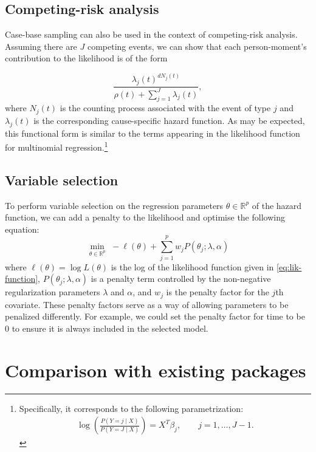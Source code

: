 \hypertarget{competing-risk-analysis}{%
\subsection{Competing-risk analysis}\label{competing-risk-analysis}}

Case-base sampling can also be used in the context of competing-risk
analysis. Assuming there are \(J\) competing events, we can show that
each person-moment's contribution to the likelihood is of the form

\[\frac{\lambda_j(t)^{dN_j(t)}}{\rho(t) + \sum_{j=1}^J\lambda_j(t)},\]
where \(N_j(t)\) is the counting process associated with the event of
type \(j\) and \(\lambda_j(t)\) is the corresponding cause-specific
hazard function. As may be expected, this functional form is similar to
the terms appearing in the likelihood function for multinomial
regression.\footnote{Specifically, it corresponds to the following parametrization: \begin{align*} \log\left(\frac{P(Y=j \mid X)}{P(Y = J \mid X)}\right) = X^T\beta_j, \qquad j = 1,\ldots, J-1.\end{align*}}

\hypertarget{variable-selection}{%
\subsection{Variable selection}\label{variable-selection}}

To perform variable selection on the regression parameters
\(\theta \in \mathbb{R}^p\) of the hazard function, we can add a penalty
to the likelihood and optimise the following equation: \begin{equation}
\min _{\theta \in \mathbb{R}^{p}}\,\,-\ell\left(\theta\right)+\sum_{j=1}^p w_j P(\theta_j;\lambda,\alpha) \label{eq:penest}
\end{equation} where \(\ell\left(\theta\right) = \log L(\theta)\) is the
log of the likelihood function given in \eqref{eq:lik-function},
\(P(\theta_j;\lambda,\alpha)\) is a penalty term controlled by the
non-negative regularization parameters \(\lambda\) and \(\alpha\), and
\(w_j\) is the penalty factor for the \(j\)th covariate. These penalty
factors serve as a way of allowing parameters to be penalized
differently. For example, we could set the penalty factor for time to be
0 to ensure it is always included in the selected model.

\hypertarget{comparison-with-existing-packages}{%
\section{Comparison with existing
packages}\label{comparison-with-existing-packages}}

